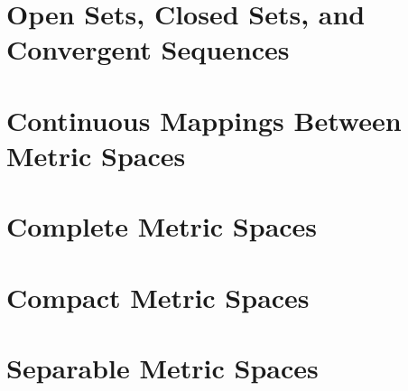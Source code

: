 \section{Open Sets, Closed Sets, and Convergent Sequences}

\section{Continuous Mappings Between Metric Spaces}

\section{Complete Metric Spaces}

\section{Compact Metric Spaces}

\section{Separable Metric Spaces}
